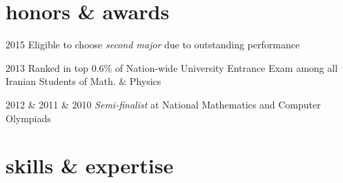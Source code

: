 \documentclass[]{friggeri-cv} %
\begin{document}

\section{honors \& awards}

\begin{entrylist}


\entry
{2015}
{}
{}
{Eligible to choose \emph{second major} due to outstanding performance}


\entry
{2013}
{}
{}
{Ranked in top 0.6\% of Nation-wide University Entrance Exam among all Iranian Students of Math. \& Physics}


\entry
{2012 \& 2011 \& 2010}
{}
{}
{\emph{Semi-finalist} at National Mathematics and Computer Olympiads}

\end{entrylist}


\section{skills \& expertise}
\end{document}

